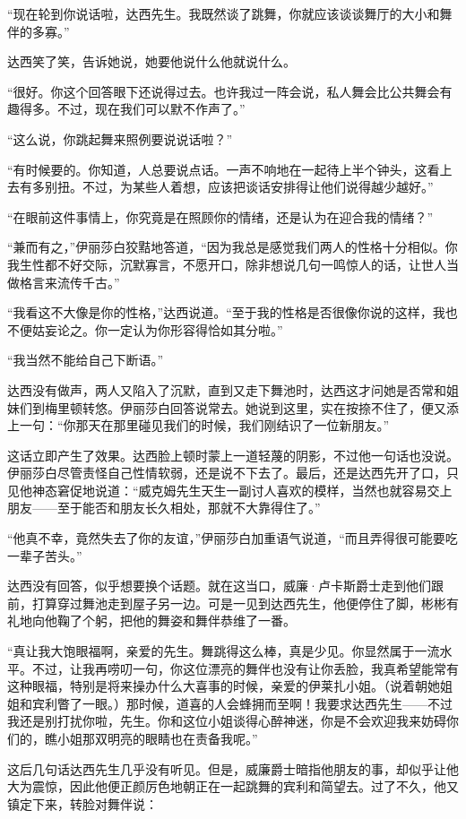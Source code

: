 \par “现在轮到你说话啦，达西先生。我既然谈了跳舞，你就应该谈谈舞厅的大小和舞伴的多寡。”
\par 达西笑了笑，告诉她说，她要他说什么他就说什么。
\par “很好。你这个回答眼下还说得过去。也许我过一阵会说，私人舞会比公共舞会有趣得多。不过，现在我们可以默不作声了。”
\par “这么说，你跳起舞来照例要说说话啦？”
\par “有时候要的。你知道，人总要说点话。一声不响地在一起待上半个钟头，这看上去有多别扭。不过，为某些人着想，应该把谈话安排得让他们说得越少越好。”
\par “在眼前这件事情上，你究竟是在照顾你的情绪，还是认为在迎合我的情绪？”
\par “兼而有之，”伊丽莎白狡黠地答道，“因为我总是感觉我们两人的性格十分相似。你我生性都不好交际，沉默寡言，不愿开口，除非想说几句一鸣惊人的话，让世人当做格言来流传千古。”
\par “我看这不大像是你的性格，”达西说道。“至于我的性格是否很像你说的这样，我也不便姑妄论之。你一定认为你形容得恰如其分啦。”
\par “我当然不能给自己下断语。”
\par 达西没有做声，两人又陷入了沉默，直到又走下舞池时，达西这才问她是否常和姐妹们到梅里顿转悠。伊丽莎白回答说常去。她说到这里，实在按捺不住了，便又添上一句：“你那天在那里碰见我们的时候，我们刚结识了一位新朋友。”
\par 这话立即产生了效果。达西脸上顿时蒙上一道轻蔑的阴影，不过他一句话也没说。伊丽莎白尽管责怪自己性情软弱，还是说不下去了。最后，还是达西先开了口，只见他神态窘促地说道：“威克姆先生天生一副讨人喜欢的模样，当然也就容易交上朋友——至于能否和朋友长久相处，那就不大靠得住了。”
\par “他真不幸，竟然失去了你的友谊，”伊丽莎白加重语气说道，“而且弄得很可能要吃一辈子苦头。”
\par 达西没有回答，似乎想要换个话题。就在这当口，威廉·卢卡斯爵士走到他们跟前，打算穿过舞池走到屋子另一边。可是一见到达西先生，他便停住了脚，彬彬有礼地向他鞠了个躬，把他的舞姿和舞伴恭维了一番。
\par “真让我大饱眼福啊，亲爱的先生。舞跳得这么棒，真是少见。你显然属于一流水平。不过，让我再唠叨一句，你这位漂亮的舞伴也没有让你丢脸，我真希望能常有这种眼福，特别是将来操办什么大喜事的时候，亲爱的伊莱扎小姐。（说着朝她姐姐和宾利瞥了一眼。）那时候，道喜的人会蜂拥而至啊！我要求达西先生——不过我还是别打扰你啦，先生。你和这位小姐谈得心醉神迷，你是不会欢迎我来妨碍你们的，瞧小姐那双明亮的眼睛也在责备我呢。”
\par 这后几句话达西先生几乎没有听见。但是，威廉爵士暗指他朋友的事，却似乎让他大为震惊，因此他便正颜厉色地朝正在一起跳舞的宾利和简望去。过了不久，他又镇定下来，转脸对舞伴说：

